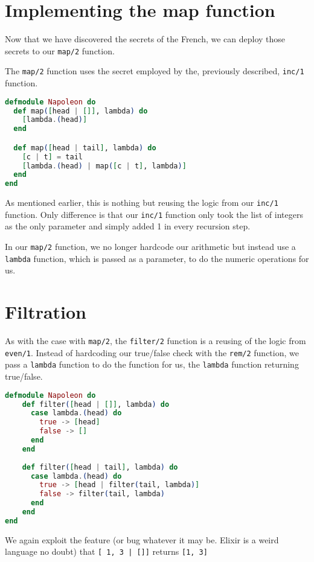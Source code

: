 \section{Implementing the map function}

Now that we have discovered the secrets of the French, we can deploy those secrets to our \texttt{map/2} function.

The \texttt{map/2} function uses the secret employed by the, previously described, \texttt{inc/1} function.

\begin{lstlisting}[language=Elixir, caption=Mapping\, recursively]
defmodule Napoleon do
  def map([head | []], lambda) do
    [lambda.(head)]
  end

  def map([head | tail], lambda) do
    [c | t] = tail
    [lambda.(head) | map([c | t], lambda)]
  end
end
\end{lstlisting}

As mentioned earlier, this is nothing but reusing the logic from our \texttt{inc/1} function. Only difference is that our \texttt{inc/1} function only took the list of integers as the only parameter and simply added 1 in every recursion step. 

In our \texttt{map/2} function, we no longer hardcode our arithmetic but instead use a \texttt{lambda} function, which is passed as a parameter, to do the numeric operations for us.


\section{Filtration}
As with the case with \texttt{map/2}, the \texttt{filter/2} function is a reusing of the logic from \texttt{even/1}. Instead of hardcoding our true/false check with the \texttt{rem/2} function, we pass a \texttt{lambda} function to do the function for us, the \texttt{lambda} function returning true/false.

\begin{lstlisting}[language=Elixir, caption=Mapping\, recursively]
defmodule Napoleon do
    def filter([head | []], lambda) do
      case lambda.(head) do
        true -> [head]
        false -> []
      end
    end
  
    def filter([head | tail], lambda) do
      case lambda.(head) do
        true -> [head | filter(tail, lambda)]
        false -> filter(tail, lambda)
      end
    end
end
\end{lstlisting}

We again exploit the feature (or bug whatever it may be. Elixir is a weird language no doubt) that \texttt{{[ 1, 3 | []]}} returns \texttt{{[1, 3]}}


